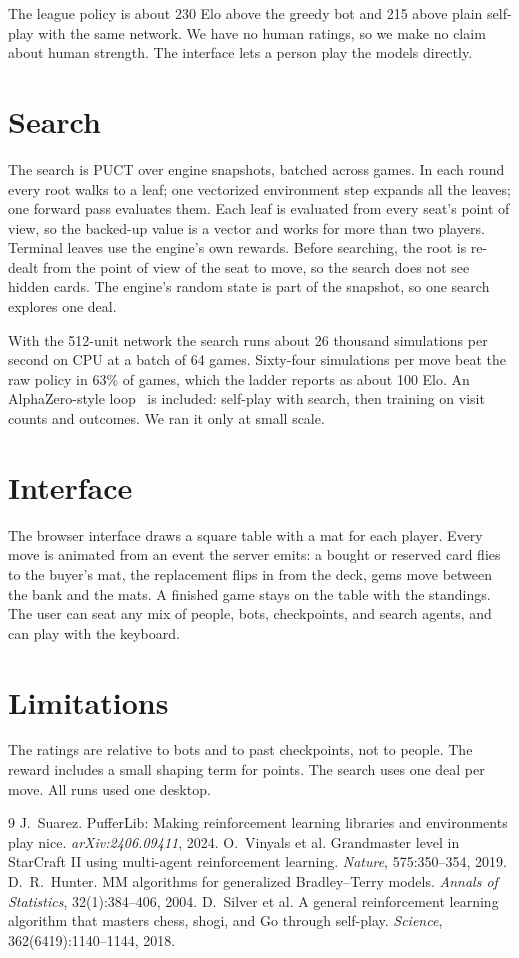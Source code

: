 \documentclass[11pt]{article}
\begin{document}
The league policy is about 230 Elo above the greedy bot and 215 above plain self-play with
the same network. We have no human ratings, so we make no claim about human strength. The
interface lets a person play the models directly.

\section{Search}
The search is PUCT over engine snapshots, batched across games. In each round every root
walks to a leaf; one vectorized environment step expands all the leaves; one forward pass
evaluates them. Each leaf is evaluated from every seat's point of view, so the backed-up
value is a vector and works for more than two players. Terminal leaves use the engine's own
rewards. Before searching, the root is re-dealt from the point of view of the seat to move,
so the search does not see hidden cards. The engine's random state is part of the snapshot,
so one search explores one deal.

With the 512-unit network the search runs about 26 thousand simulations per second on CPU
at a batch of 64 games. Sixty-four simulations per move beat the raw policy in 63\% of
games, which the ladder reports as about 100 Elo. An AlphaZero-style loop~\cite{silver2018}
is included: self-play with search, then training on visit counts and outcomes. We ran it
only at small scale.

\section{Interface}
The browser interface draws a square table with a mat for each player. Every move is
animated from an event the server emits: a bought or reserved card flies to the buyer's mat,
the replacement flips in from the deck, gems move between the bank and the mats. A finished
game stays on the table with the standings. The user can seat any mix of people, bots,
checkpoints, and search agents, and can play with the keyboard.

\section{Limitations}
The ratings are relative to bots and to past checkpoints, not to people. The reward includes
a small shaping term for points. The search uses one deal per move. All runs used one
desktop.

\begin{thebibliography}{9}
 J.~Suarez. PufferLib: Making reinforcement learning libraries and
environments play nice. \emph{arXiv:2406.09411}, 2024.
 O.~Vinyals et al. Grandmaster level in StarCraft II using multi-agent
reinforcement learning. \emph{Nature}, 575:350--354, 2019.
 D.~R.~Hunter. MM algorithms for generalized Bradley--Terry models.
\emph{Annals of Statistics}, 32(1):384--406, 2004.
 D.~Silver et al. A general reinforcement learning algorithm that masters
chess, shogi, and Go through self-play. \emph{Science}, 362(6419):1140--1144, 2018.
\end{thebibliography}
\end{document}
